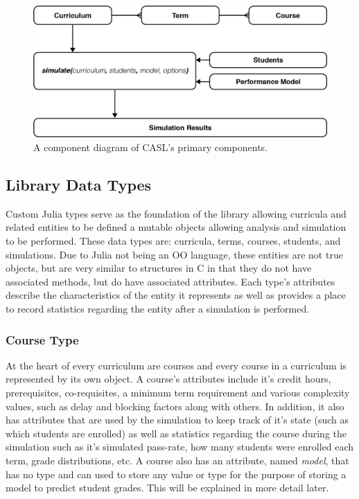 \documentclass[botnum, fleqn]{unmeethesis}
\begin{document}
    \begin{figure}[h!]
      \centerline{\includegraphics[scale=0.4]{./figures/components.png}}
      \caption{A component diagram of CASL's primary components.} 
      \label{fig:component_diagram}
    \end{figure}

    \subsection{Library Data Types}
      Custom Julia types serve as the foundation of the library allowing curricula and related entities to be defined a mutable objects allowing analysis and simulation to be performed. These data types are: curricula, terms, courses, students, and simulations. Due to Julia not being an OO language, these entities are not true objects, but are very similar to structures in C in that they do not have associated methods, but do have associated attributes. Each type's attributes describe the characteristics of the entity it represents as well as provides a place to record statistics regarding the entity after a simulation is performed.

      \subsubsection{Course Type}
        At the heart of every curriculum are courses and every course in a curriculum is represented by its own object. A course's attributes include it's credit hours, prerequisites, co-requisites, a minimum term requirement and various complexity values, such as delay and blocking factors along with others. In addition, it also has attributes that are used by the simulation to keep track of it's state (such as which students are enrolled) as well as statistics regarding the course during the simulation such as it's simulated pass-rate, how many students were enrolled each term, grade distributions, etc. A course also has an attribute, named \textit{model}, that has no type and can used to store any value or type for the purpose of storing a model to predict student grades. This will be explained in more detail later.
\end{document}
